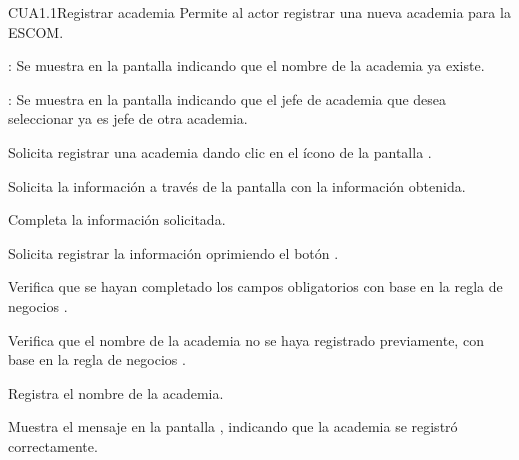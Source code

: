 \begin{UseCase}{CUA1.1}{Registrar academia}{	
	Permite al actor registrar una nueva academia para la ESCOM.
}
{\begin{UClist}
			\UCli {}: Se muestra en la pantalla  indicando que el nombre de la academia ya existe.
			
			\UCli {}: Se muestra en la pantalla  indicando que el jefe de academia que desea seleccionar ya es jefe de otra academia.
			
		\end{UClist}
	}
\end{UseCase}

\begin{UCtrayectoria}
	\UCpaso [\UCactor] Solicita registrar una academia dando clic en el ícono %
	de la pantalla . 
	
	

	\UCpaso[\UCsist] Solicita la información a través de la pantalla  con la información obtenida.
	
	\UCpaso [\UCactor] Completa la información solicitada. \label{CUA1.1:CompletaInfo}
	
	\UCpaso [\UCactor] Solicita registrar la información oprimiendo el botón . 
	
	\UCpaso [\UCsist] Verifica que se hayan completado los campos obligatorios con base en la regla de negocios . 
	
	\UCpaso [\UCsist] Verifica que el nombre de la academia no se haya registrado previamente, con base en la regla de negocios . 
		
	
	\UCpaso [\UCsist] Registra el nombre de la academia.
	
	\UCpaso [\UCsist] Muestra el mensaje  en la pantalla , indicando que la academia se registró correctamente.	
	
\end{UCtrayectoria}

